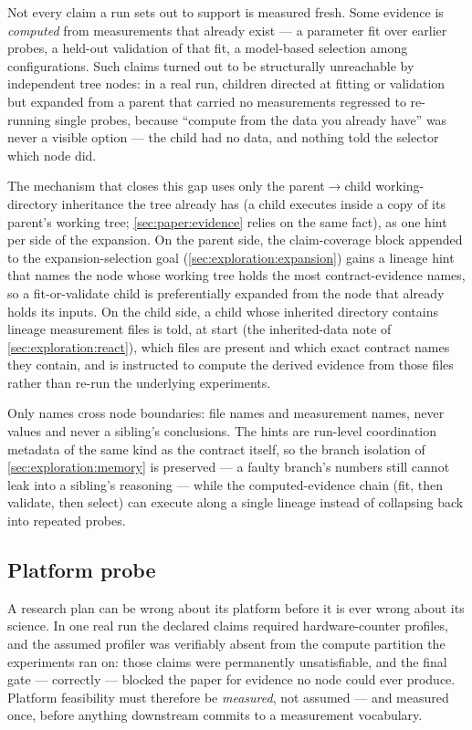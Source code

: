 Not every claim a run sets out to support is measured fresh. Some
evidence is \emph{computed} from measurements that already exist --- a
parameter fit over earlier probes, a held-out validation of that fit, a
model-based selection among configurations. Such claims turned out to be
structurally unreachable by independent tree nodes: in a real run,
children directed at fitting or validation but expanded from a parent
that carried no measurements regressed to re-running single probes,
because ``compute from the data you already have'' was never a visible
option --- the child had no data, and nothing told the selector which
node did.

The mechanism that closes this gap uses only the parent$\to$child
working-directory inheritance the tree already has (a child executes
inside a copy of its parent's working tree;
\cref{sec:paper:evidence} relies on the same fact), as one hint per
side of the expansion. On the parent side, the claim-coverage block
appended to the expansion-selection goal
(\cref{sec:exploration:expansion}) gains a lineage hint that names
the node whose working tree holds the most contract-evidence names,
so a fit-or-validate child is preferentially expanded from the node
that already holds its inputs. On the child side, a child
whose inherited directory contains lineage measurement files is told,
at start (the inherited-data note of \cref{sec:exploration:react}),
which files are present and which exact contract names they
contain, and is instructed to compute the derived evidence from those
files rather than re-run the underlying experiments.

Only names cross node boundaries: file names and measurement names,
never values and never a sibling's conclusions. The hints are
run-level coordination metadata of the same kind as the contract
itself, so the branch isolation of \cref{sec:exploration:memory} is
preserved --- a faulty branch's numbers still cannot leak into a
sibling's reasoning --- while the computed-evidence chain
(fit, then validate, then select) can execute along a single lineage
instead of collapsing back into repeated probes.

\subsection{Platform probe}\label{sec:exploration:platform-probe}

A research plan can be wrong about its platform before it is ever
wrong about its science. In one real run the declared claims required
hardware-counter profiles, and the assumed profiler was verifiably
absent from the compute partition the experiments ran on: those
claims were permanently unsatisfiable, and the final gate ---
correctly --- blocked the paper for evidence no node could ever
produce. Platform feasibility must therefore be \emph{measured}, not
assumed --- and measured once, before anything downstream commits to
a measurement vocabulary.

